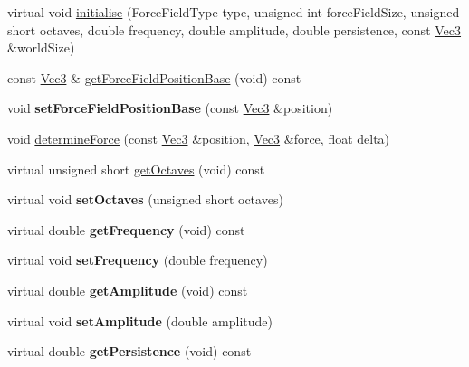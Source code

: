 \begin{DoxyCompactItemize}
\item 
virtual void \hyperlink{classPUForceField_af295323d9a536013ff1d945ceb282739}{initialise} (Force\+Field\+Type type, unsigned int force\+Field\+Size, unsigned short octaves, double frequency, double amplitude, double persistence, const \hyperlink{classVec3}{Vec3} \&world\+Size)
\item 
const \hyperlink{classVec3}{Vec3} \& \hyperlink{classPUForceField_a5d0fa8a04f77a32cf7503dd96ba0938c}{get\+Force\+Field\+Position\+Base} (void) const
\item 
\mbox{\label{classPUForceField_abe7dca4bb32ed3ced61382aa65c89c95}} 
void {\bfseries set\+Force\+Field\+Position\+Base} (const \hyperlink{classVec3}{Vec3} \&position)
\item 
void \hyperlink{classPUForceField_a08d8c55f04d849d4232d36a41bfb543e}{determine\+Force} (const \hyperlink{classVec3}{Vec3} \&position, \hyperlink{classVec3}{Vec3} \&force, float delta)
\item 
virtual unsigned short \hyperlink{classPUForceField_a69ab67c2af698b8f9ddb3a5208045fa1}{get\+Octaves} (void) const
\item 
\mbox{\label{classPUForceField_a1391361891df9a81442c63ce360c3415}} 
virtual void {\bfseries set\+Octaves} (unsigned short octaves)
\item 
\mbox{\label{classPUForceField_a730468b444e9eccafd41fe18b323ab9c}} 
virtual double {\bfseries get\+Frequency} (void) const
\item 
\mbox{\label{classPUForceField_a7ef89eacbd51cf743972715788a5e1c2}} 
virtual void {\bfseries set\+Frequency} (double frequency)
\item 
\mbox{\label{classPUForceField_a6dcfe17261a5fd2a549386a2eca43534}} 
virtual double {\bfseries get\+Amplitude} (void) const
\item 
\mbox{\label{classPUForceField_a9cdf9c802d325123ff22b5abe8fd9658}} 
virtual void {\bfseries set\+Amplitude} (double amplitude)
\item 
\mbox{\label{classPUForceField_a1fec8a86b6ffffab5af5aad4bdc55466}} 
virtual double {\bfseries get\+Persistence} (void) const

\end{DoxyCompactItemize}
